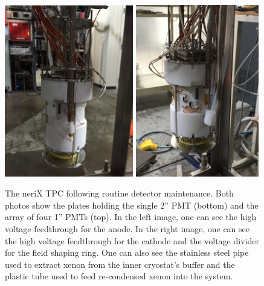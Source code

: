 \begin{figure}[t]
        \centering
	\includegraphics[width=0.50\textwidth]{nerix_tpc_anode}
	\includegraphics[width=0.48\textwidth]{nerix_tpc_cathode}
	\caption{The neriX TPC following routine detector maintenance.  Both photos show the plates holding the single 2'' PMT (bottom) and the array of four 1'' PMTs (top).  In the left image, one can see the high voltage feedthrough for the anode.  In the right image, one can see the high voltage feedthrough for the cathode and the voltage divider for the field shaping ring.  One can also see the stainless steel pipe used to extract xenon from the inner cryostat's buffer and the plastic tube used to feed re-condensed xenon into the system.}
	\label{fig:nerix_tpc}
\end{figure}



